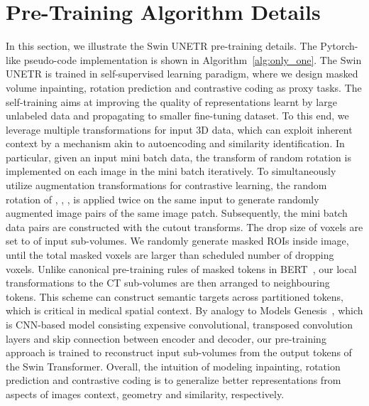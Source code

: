 \documentclass[10pt,twocolumn,letterpaper]{article}
\begin{document}
\section{Pre-Training Algorithm Details}
\label{sec:pretrain}
In this section, we illustrate the Swin UNETR pre-training details. The Pytorch-like pseudo-code implementation is shown in Algorithm~\ref{alg:only_one}. The Swin UNETR is trained in self-supervised learning paradigm, where we design masked volume inpainting, rotation prediction and contrastive coding as proxy tasks. The self-training aims at improving the quality of representations learnt by large unlabeled data and propagating to smaller fine-tuning dataset. To this end, we leverage multiple transformations for input 3D data, which can exploit inherent context by a mechanism akin to autoencoding and similarity identification. In particular, given an input mini batch data, the transform of random rotation is implemented on each image in the mini batch iteratively. To simultaneously utilize augmentation transformations for contrastive learning, the random rotation of , , ,  is applied twice on the same input to generate randomly augmented image pairs of the same image patch. Subsequently, the mini batch data pairs are constructed with the cutout transforms. The drop size of voxels are set to  of input sub-volumes. We randomly generate masked ROIs inside image, until the total masked voxels are larger than scheduled number of dropping voxels. Unlike canonical pre-training rules of masked tokens in BERT~\cite{devlin2018bert}, our local transformations to the CT sub-volumes are then arranged to neighbouring tokens. This scheme can construct semantic targets across partitioned tokens, which is critical in medical spatial context. By analogy to Models Genesis~\cite{zhou2021models}, which is CNN-based model consisting expensive convolutional, transposed convolution layers and skip connection between encoder and decoder, our pre-training approach is trained to reconstruct input sub-volumes from the output tokens of the Swin Transformer. Overall, the intuition of modeling inpainting, rotation prediction and contrastive coding is to generalize better representations from aspects of images context, geometry and similarity, respectively.
\end{document}
